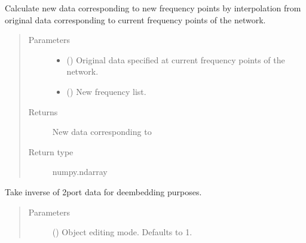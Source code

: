 \documentclass[letterpaper,10pt,english]{sphinxmanual}
\begin{document}
\begin{fulllineitems}
\begin{fulllineitems}
\label{\detokenize{touchstone:touchstone.spfile.interpolate_data}}
Calculate new data corresponding to new frequency points  by interpolation from original data corresponding to current frequency points of the network.
\begin{quote}\begin{description}
\item[{Parameters}] \leavevmode\begin{itemize}
\item {} 
 () \textendash{} Original data specified at current frequency points of the network.

\item {} 
 () \textendash{} New frequency list.

\end{itemize}

\item[{Returns}] \leavevmode
New data corresponding to 

\item[{Return type}] \leavevmode
numpy.ndarray

\end{description}\end{quote}

\end{fulllineitems}


\begin{fulllineitems}
\label{\detokenize{touchstone:touchstone.spfile.inverse_2port}}
Take inverse of 2\sphinxhyphen{}port data for de\sphinxhyphen{}embedding purposes.
\begin{quote}\begin{description}
\item[{Parameters}] \leavevmode
{} (\sphinxstyleliteralemphasis{\sphinxupquote{, }}) \textendash{} Object editing mode. Defaults to \sphinxhyphen{}1.


\end{description}
\end{quote}
\end{fulllineitems}
\end{fulllineitems}
\end{document}
